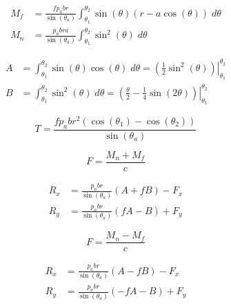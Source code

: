 \documentclass[12pt, letterpaper]{extarticle}
\begin{document}
\newpage
{}

\begin{align*}
    M_{f} &= \frac{fp_{a}br}{\sin(\theta_{a})} \int_{\theta_{1}}^{\theta_{2}} \sin(\theta) (r - a\cos(\theta)) \; d\theta \\
    M_{n} &= \frac{p_{a}bra}{\sin(\theta_{a})} \int_{\theta_{1}}^{\theta_{2}} \sin^{2}(\theta) \; d\theta
\end{align*}

\begin{align*}
    A &= \int_{\theta_{1}}^{\theta_{2}} \sin(\theta)\cos(\theta) \; d\theta = \left.\left(\frac{1}{2}\sin^{2}(\theta)\right) \right|_{\theta_{1}}^{\theta_{2}} \\
    B &= \int_{\theta_{1}}^{\theta_{2}} \sin^{2}(\theta) \; d\theta = \left.\left(\frac{\theta}{2} - \frac{1}{4}\sin(2\theta)\right) \right|_{\theta_{1}}^{\theta_{2}}
\end{align*}

\begin{equation*}
    T = \frac{fp_{a}br^2(\cos(\theta_{1}) - \cos(\theta_{2}))}{\sin(\theta_{a})}
\end{equation*}


\begin{equation*}
    F = \frac{M_{n} + M_{f}}{c}
\end{equation*}

\begin{align*}
    R_{x} &= \frac{p_{a}br}{\sin(\theta_{a})}(A + fB) - F_{x} \\
    R_{y} &= \frac{p_{a}br}{\sin(\theta_{a})}(fA - B) + F_{y}
\end{align*}


\begin{equation*}
    F = \frac{M_{n} - M_{f}}{c}
\end{equation*}

\begin{align*}
    R_{x} &= \frac{p_{a}br}{\sin(\theta_{a})}(A - fB) - F_{x} \\
    R_{y} &= \frac{p_{a}br}{\sin(\theta_{a})}(-fA - B) + F_{y}
\end{align*}
\end{document}
